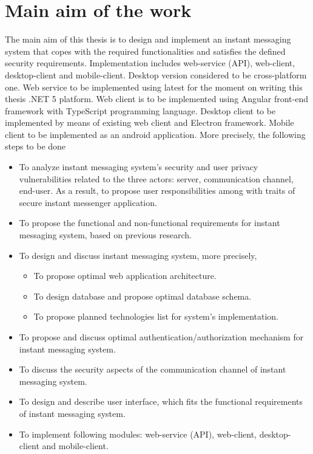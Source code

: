 \chapter{Main aim of the work}\label{ch:main-aim-of-the-work}

The main aim of this thesis is to design and implement an instant messaging system
that copes with the required functionalities and satisfies the defined security requirements.
Implementation includes web-service (API), web-client, desktop-client and mobile-client.
Desktop version considered to be cross-platform one.
Web service to be implemented using latest for the moment on writing this thesis .NET 5 platform.
Web client is to be implemented using Angular front-end framework with TypeScript programming language.
Desktop client to be implemented by means of existing web client and Electron framework.
Mobile client to be implemented as an android application.
More precisely, the following steps to be done
\begin{itemize}
    \item To analyze instant messaging system's security and user privacy vulnerabilities related to the three
    actors: server, communication channel, end-user.
    As a result, to propose user responsibilities among with traits of secure instant messenger application.
    \item To propose the functional and non-functional requirements for instant messaging system, based on previous
    research.
    \item To design and discuss instant messaging system, more precisely,
    \begin{itemize}
        \item To propose optimal web application architecture.
        \item To design database and propose optimal database schema.
        \item To propose planned technologies list for system's implementation.
    \end{itemize}
    \item To propose and discuss optimal authentication/authorization mechanism for instant messaging system.
    \item To discuss the security aspects of the communication channel of instant messaging system.
    \item To design and describe user interface, which fits the functional requirements of instant messaging system.
    \item To implement following modules: web-service (API), web-client, desktop-client and mobile-client.
\end{itemize}